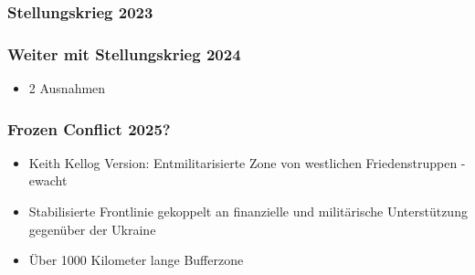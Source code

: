 {}\documentclass[a4paper]{article}
\providecommand{\tightlist}{\setlength{\itemsep}{1mm}\setlength{\parskip}{1mm}}
\begin{document}
\subsubsection{Stellungskrieg 2023}\label{stellungskrieg-2023}

\subsubsection{Weiter mit Stellungskrieg
	2024}\label{weiter-mit-stellungskrieg-2024}

\begin{itemize}
	\tightlist
	\item
	      2 Ausnahmen
\end{itemize}

\subsubsection{Frozen Conflict 2025?}\label{frozen-conflict-2025}

\begin{itemize}
	\tightlist
	\item
	      Keith Kellog Version: Entmilitarisierte Zone von westlichen
	      Friedenstruppen -ewacht
	\item
	      Stabilisierte Frontlinie gekoppelt an finanzielle und militärische
	      Unterstützung gegenüber der Ukraine
	\item
	      Über 1000 Kilometer lange Bufferzone
\end{itemize}
\end{document}
